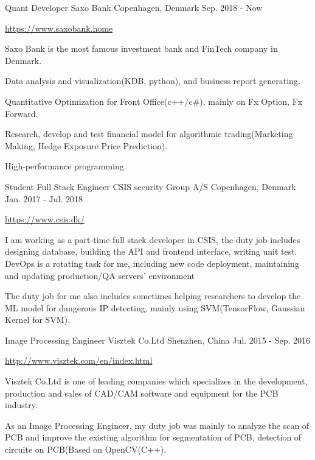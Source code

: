 \begin{cventries}
  \cventry
    {Quant Developer}
    {Saxo Bank}
    {Copenhagen, Denmark}
    {Sep. 2018 - Now}
    {
	    \begin{cvitems}
            \item {\url{https://www.saxobank.home}}
            \item {Saxo Bank is the most famous investment bank and FinTech company in Denmark.}
	          \item {Data analysis and visualization(KDB, python), and business report generating.}
	          \item {Quantitative Optimization for Front Office(c++/c$\#$), mainly on Fx Option, Fx Forward.}
            \item {Research, develop and test financial model for algorithmic trading(Marketing Making, Hedge Exposure Price Prediction).}
            \item {High-performance programming.}
	    \end{cvitems}
    }
  \cventry
    {Student Full Stack Engineer}
    {CSIS security Group A/S}
    {Copenhagen, Denmark}
    {Jan. 2017 - Jul. 2018}
    {
      \begin{cvitems}
        \item {\url{https://www.csis.dk/}}
        \item {I am working as a part-time full stack developer in CSIS, the duty job includes designing database, building the API and frontend interface, writing unit test. DevOps is a rotating task for me, including new code deployment, maintaining and updating production/QA servers' environment}
	\item {The duty job for me also includes sometimes helping researchers to develop the ML model for dangerous IP detecting, mainly using SVM(TensorFlow, Gaussian Kernel for SVM).}
      \end{cvitems}
    }
  \cventry
    {Image Processing Engineer}
    {Visztek Co.Ltd}
    {Shenzhen, China}
    {Jul. 2015 - Sep. 2016}
    {
      \begin{cvitems}
        \item {\url{http://www.visztek.com/en/index.html}}
        \item {Visztek Co.Ltd is one of leading companies which specializes in the development, production and sales of CAD/CAM software and equipment for the PCB industry.}
	\item {As an Image Processing Engineer, my duty job was mainly to analyze the scan of PCB and improve the existing algorithm for segmentation of PCB, detection of circuite on PCB(Based on OpenCV(C++).}

\end{cvitems}}
\end{cventries}
